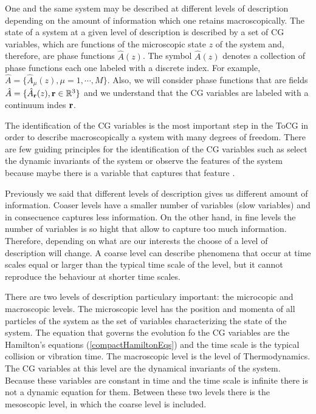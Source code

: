 \documentclass[a4paper,openright,12pt]{book}
\begin{document}
One and the same system may be described at different levels of description depending on the amount of information which one retains macroscopically. The state of a system at a given level of description is described by a set of CG variables, which are functions of the microscopic state $z$ of the system and, therefore, are phase functions $\hat{A}(z)$. The symbol $\hat{A}(z)$ denotes a collection of phase functions each one labeled with a discrete index. For example, $\hat{A}=\{\hat{A}_{\mu}(z), \mu=1,\cdots, M\}$. Also, we will consider phase functions that are fields $\hat{A}=\{\hat{A}_{\bf r}(z), {\bf r}\in\mathbb{R}^3\}$ and we understand that the CG variables are labeled with a continuum indes ${\bf r}$. 

The identification of the CG variables is the most important step in the ToCG in order to describe macroscopically a system with many degrees of freedom. There are few guiding principles for the identification of the CG variables such as select the dynamic invariants of the system or observe the features of the system because maybe there is a variable that captures that feature \cite{Karttunen2004}.

Previously we said that different levels of description gives us different amount of information. Coaser levels have a smaller number of variables (slow variables) and in consecuence captures less information. On the other hand, in fine levels the number of variables is so hight that allow to capture too much information. Therefore, depending on what are our interests the choose of a level of description will change. A coarse level can describe phenomena that occur at time scales equal or larger than the typical time scale of the level, but it cannot reproduce the behaviour at shorter time scales.

There are two levels of description particulary important: the microcopic and macroscopic levels. The microscopic level has the position and momenta of all particles of the system as the set of variables characterizing the state of the system. The equation that governs the evolution fo the CG variables are the Hamilton's equations (\ref{compactHamiltonEqs}) and the time scale is the typical collision or vibration time. The macroscopic level is the level of Thermodynamics. The CG variables at this level are the dynamical invariants of the system. Because these variables are constant in time and the time scale is infinite there is not a dynamic equation for them. Between these two levels there is the mesoscopic level, in which the coarse level is included.
\end{document}
